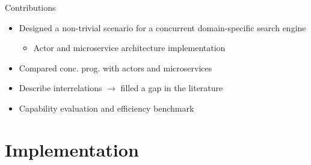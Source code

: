 \documentclass{beamer}
\begin{document}

\begin{frame}{Contributions}

\begin{itemize}
  \item Designed a non-trivial scenario for a concurrent domain-specific search engine
  \begin{itemize}
    \item Actor and microservice architecture implementation
  \end{itemize}
  \item Compared conc. prog. with actors and microservices
  \item Describe interrelations $\rightarrow$ filled a gap in the literature
  \item Capability evaluation and efficiency benchmark
\end{itemize}

\end{frame}


\section{Implementation}

\end{document}
